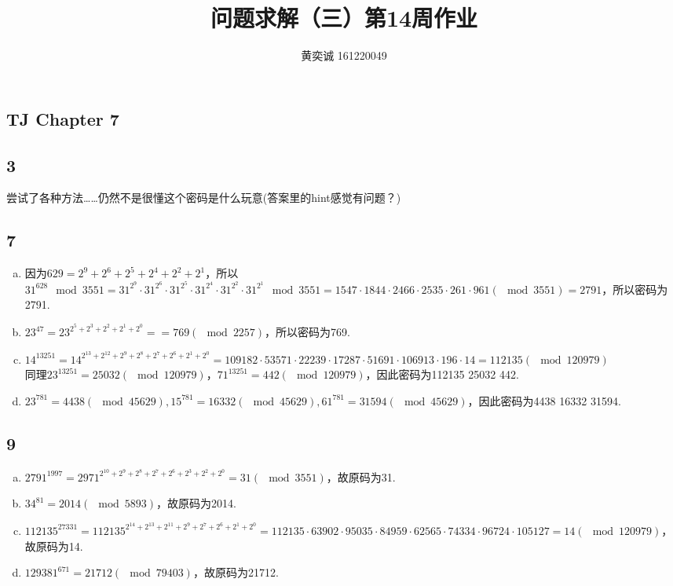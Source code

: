 \documentclass[twocolumn]{article}
\newenvironment{SChinese}{
	\CJKfamily{gbsn}
	\CJKtilde
	\CJKnospace}{}
\begin{document}
	\begin{CJK}{UTF8}{}	
		\begin{SChinese}	
			\title{问题求解（三）第14周作业}
			\author{黄奕诚 161220049}
			\maketitle
			
			\section*{TJ Chapter 7}
			\subsection*{3}
				尝试了各种方法……仍然不是很懂这个密码是什么玩意(答案里的hint感觉有问题？)
			\subsection*{7}
				\begin{enumerate}[(a)]
					\item 因为$629=2^9+2^6+2^5+2^4+2^2+2^1$，所以$31^{628}\mod3551=31^{2^9}\cdot31^{2^6}\cdot31^{2^5}\cdot31^{2^4}\cdot31^{2^2}\cdot31^{2^1}\mod3551=1547\cdot1844\cdot2466\cdot2535\cdot261\cdot961(\mod3551)=2791$，所以密码为2791.\\
					\item $23^{47}=23^{2^5+2^3+2^2+2^1+2^0}==769(\mod2257)$，所以密码为769.\\
					\item $14^{13251}=14^{2^{13}+2^{12}+2^9+2^8+2^7+2^6+2^1+2^0}=109182\cdot53571\cdot22239\cdot17287\cdot51691\cdot106913\cdot196\cdot14=112135(\mod120979)$\\
					同理$23^{13251}=25032(\mod120979)$，$71^{13251}=442(\mod120979)$，因此密码为112135 25032 442.\\
					\item 
					$23^{781}=4438(\mod45629),15^{781}=16332(\mod45629),61^{781}=31594(\mod45629)$，因此密码为4438 16332 31594.\\
					
				\end{enumerate}
			\subsection*{9}
				\begin{enumerate}[(a)]
					\item $2791^{1997}=2971^{2^{10}+2^9+2^8+2^7+2^6+2^3+2^2+2^0}=31(\mod3551)$，故原码为31.\\
					\item $34^{81}=2014(\mod5893)$，故原码为2014.\\
					\item $112135^{27331}=112135^{2^{14}+2^{13}+2^{11}+2^9+2^7+2^6+2^1+2^0}=112135\cdot63902\cdot95035\cdot84959\cdot62565\cdot74334\cdot96724\cdot105127=14(\mod120979)$，故原码为14.\\
					\item $129381^{671}=21712(\mod79403)$，故原码为21712.\\
				\end{enumerate}

\end{SChinese}
\end{CJK}
\end{document}
